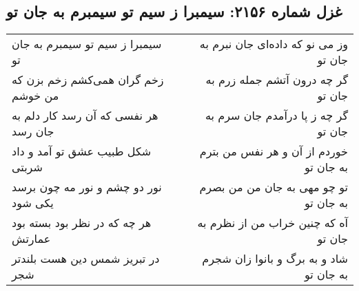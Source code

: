 \begin{center}
\section*{غزل شماره ۲۱۵۶: سیمبرا ز سیم تو سیمبرم به جان تو}
\label{sec:2156}
\begin{longtable}{l p{0.5cm} r}
سیمبرا ز سیم تو سیمبرم به جان تو
&&
وز می نو که داده‌ای جان نبرم به جان تو
\\
زخم گران همی‌کشم زخم بزن که من خوشم
&&
گر چه درون آتشم جمله زرم به جان تو
\\
هر نفسی که آن رسد کار دلم به جان رسد
&&
گر چه ز پا درآمدم جان سرم به جان تو
\\
شکل طبیب عشق تو آمد و داد شربتی
&&
خوردم از آن و هر نفس من بترم به جان تو
\\
نور دو چشم و نور مه چون برسد یکی شود
&&
تو چو مهی به جان من من بصرم به جان تو
\\
هر چه که در نظر بود بسته بود عمارتش
&&
آه که چنین خراب من از نظرم به جان تو
\\
در تبریز شمس دین هست بلندتر شجر
&&
شاد و به برگ و بانوا زان شجرم به جان تو
\\
\end{longtable}
\end{center}
